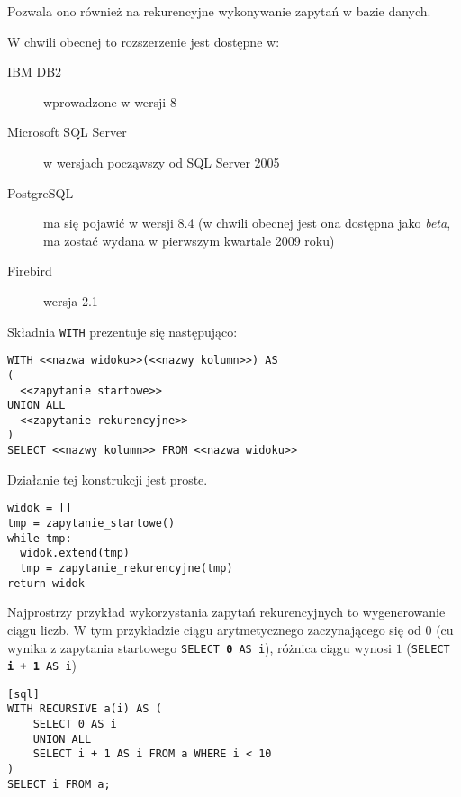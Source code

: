 Pozwala ono również na rekurencyjne wykonywanie zapytań w bazie danych.

W chwili obecnej to rozszerzenie jest dostępne w:
\begin{description}
 \item[IBM DB2]
    wprowadzone w wersji 8
 \item[Microsoft SQL Server]
	w wersjach począwszy od SQL Server 2005
 \item[PostgreSQL]
	ma się pojawić w wersji 8.4 (w chwili obecnej jest ona dostępna jako \emph{beta}, ma zostać wydana w pierwszym kwartale 2009 roku)
 \item[Firebird]
	wersja 2.1 
\end{description}




Składnia \texttt{WITH} prezentuje się następująco:




\begin{verbatim}
WITH <<nazwa widoku>>(<<nazwy kolumn>>) AS
(
  <<zapytanie startowe>>
UNION ALL
  <<zapytanie rekurencyjne>>
)
SELECT <<nazwy kolumn>> FROM <<nazwa widoku>>
\end{verbatim}

Działanie tej konstrukcji jest proste.

\begin{verbatim}
widok = []
tmp = zapytanie_startowe()
while tmp:
  widok.extend(tmp)
  tmp = zapytanie_rekurencyjne(tmp)
return widok
\end{verbatim}

Najprostrzy przykład wykorzystania zapytań rekurencyjnych to wygenerowanie ciągu liczb. 
W tym przykładzie ciągu arytmetycznego zaczynającego się od $0$ (cu wynika z zapytania startowego \texttt{SELECT \textbf{0} AS i}), 
różnica ciągu wynosi $1$ (\texttt{SELECT \textbf{i + 1} AS i})

\begin{verbatim}[sql]
WITH RECURSIVE a(i) AS (
    SELECT 0 AS i
    UNION ALL
    SELECT i + 1 AS i FROM a WHERE i < 10
)
SELECT i FROM a;
\end{verbatim}



